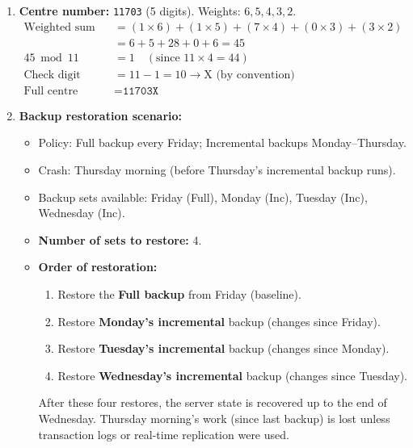 \documentclass[11pt]{article}
\begin{document}
\begin{corrige}
\begin{enumerate}
\item \textbf{Centre number:} \texttt{11703} (5 digits). Weights: $6, 5, 4, 3, 2$.
\begin{align*}
\text{Weighted sum} &= (1\times6) + (1\times5) + (7\times4) + (0\times3) + (3\times2) \\
                    &= 6 + 5 + 28 + 0 + 6 = 45 \\
45 \bmod 11 &= 1 \quad (\text{since } 11 \times 4 = 44) \\
\text{Check digit} &= 11 - 1 = 10 \rightarrow \text{X (by convention)} \\
\text{Full centre number} &= \texttt{11703X}
\end{align*}
\item \textbf{Backup restoration scenario:}
\begin{itemize}
\item Policy: Full backup every Friday; Incremental backups Monday–Thursday.
\item Crash: Thursday morning (before Thursday's incremental backup runs).
\item Backup sets available: Friday (Full), Monday (Inc), Tuesday (Inc), Wednesday (Inc).
\item \textbf{Number of sets to restore:} 4.
\item \textbf{Order of restoration:}
\begin{enumerate}
\item Restore the \textbf{Full backup} from Friday (baseline).
\item Restore \textbf{Monday's incremental} backup (changes since Friday).
\item Restore \textbf{Tuesday's incremental} backup (changes since Monday).
\item Restore \textbf{Wednesday's incremental} backup (changes since Tuesday).
\end{enumerate}
After these four restores, the server state is recovered up to the end of Wednesday. Thursday morning's work (since last backup) is lost unless transaction logs or real-time replication were used.
\end{itemize}
\end{enumerate}
\end{corrige}
\end{document}
